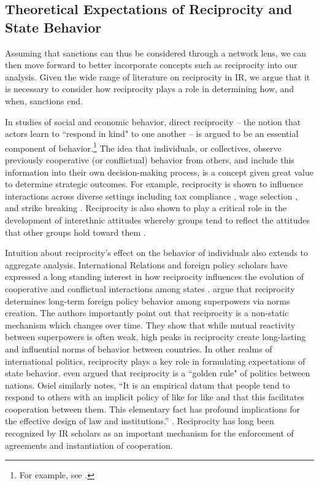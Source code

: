 \subsection{Theoretical Expectations of Reciprocity and State Behavior}
Assuming that sanctions can thus be considered through a network lens, we can then move forward to better incorporate concepts such as reciprocity into our analysis. Given the wide range of literature on reciprocity in IR, we argue that it is necessary to consider how reciprocity plays a role in determining how, and when, sanctions end.

 In studies of social and economic behavior, direct reciprocity -- the notion that actors learn to ``respond in kind" to one another -- is argued to be an essential component of behavior.\footnote{For example, see \cite{bolton:1998, charness:2002, charness:2004, cox:2007, cox:2004}.} The idea that individuals, or collectives, observe previously cooperative (or conflictual) behavior from others, and include this information into their own decision-making process, is a concept given great value to determine strategic outcomes. For example, reciprocity is shown to influence interactions across diverse settings including tax compliance \citep{smith:1990}, wage selection \citep{campbell:1997}, and strike breaking \citep{brett:1998}. Reciprocity is also shown to play a critical role in the development of interethnic attitudes whereby groups tend to reflect the attitudes that other groups hold toward them \citep{berry:1979}. 

Intuition about reciprocity's effect on the behavior of individuals also extends to aggregate analysis. International Relations and foreign policy scholars have expressed a long standing interest in how reciprocity influences the evolution of cooperative and conflictual interactions among states \citep{richardson1960, keohane1989reciprocity}. \cite{rajmaira:1990} argue that reciprocity determines long-term foreign policy behavior among superpowers via norms creation. The authors importantly point out that reciprocity is a non-static mechanism which changes over time. They show that while mutual reactivity between superpowers is often weak, high peaks in reciprocity create long-lasting and influential norms of behavior between countries. In other realms of international politics, reciprocity plays a key role in formulating expectations of state behavior. \cite{ward1981} even argued that reciprocity is a ``golden rule" of politics between nations.  Osiel similarly notes, ``It is an empirical datum that people tend to respond to others with an implicit policy of like for like and that this facilitates cooperation between them. This elementary fact has profound implications for the effective design of law and institutions.'' \cite[p. 19]{osiel:2009}. Reciprocity has long been recognized by IR scholars as an important mechanism for the enforcement of agreements and instantiation of cooperation. 

